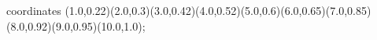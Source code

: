 					coordinates { (1.0,0.22)(2.0,0.3)(3.0,0.42)(4.0,0.52)(5.0,0.6)(6.0,0.65)(7.0,0.85)(8.0,0.92)(9.0,0.95)(10.0,1.0)};